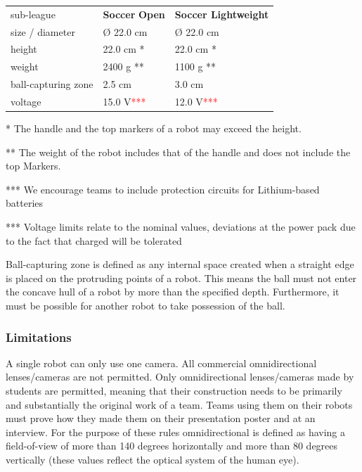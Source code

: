 \documentclass{article}
\begin{document}
\begin{table}
\begin{tabularx}{\textwidth}{
p{}
p{}
p{}}
sub-league & \textbf{Soccer} \textbf{Open} & \textbf{Soccer Lightweight} \\
size / diameter & \O{} 22.0 cm & \O{} 22.0 cm \\
height & 22.0 cm * & 22.0 cm * \\
weight & 2400 g ** & 1100 g ** \\
ball-capturing zone & 2.5 cm & 3.0 cm \\
voltage & 15.0 V\textcolor{red}{***} & 12.0 V\textcolor{red}{***} \\

\end{tabularx}

\end{table}

* The handle and the top markers of a robot may exceed the height.

** The weight of the robot includes that of the handle and does not include the top Markers.

*** We encourage teams to include protection circuits for Lithium-based batteries

*** Voltage limits relate to the nominal values, deviations at the power pack due to the fact that charged will be tolerated

Ball-capturing zone is defined as any internal space created when a straight edge is placed on the protruding points of a robot. This means the ball must not enter the concave hull of a robot by more than the specified depth. Furthermore, it must be possible for another robot to take possession of the ball.

\subsubsection{Limitations\label{ref-056}}

A single robot can only use one camera. All commercial omnidirectional lenses/cameras are not permitted. Only omnidirectional lenses/cameras made by students are permitted, meaning that their construction needs to be primarily and substantially the original work of a team. Teams using them on their robots must prove how they made them on their presentation poster and at an interview. For the purpose of these rules omnidirectional is defined as having a field-of-view of more than 140 degrees horizontally and more than 80 degrees vertically (these values reflect the optical system of the human eye).
\end{document}
